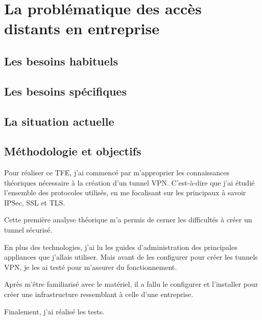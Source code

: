 \part{La problématique des accès distants en entreprise}
\chapter{Les besoins habituels}
\chapter{Les besoins spécifiques}
\chapter{La situation actuelle}
\chapter{Méthodologie et objectifs}
Pour réaliser ce TFE, j'ai commencé par m'approprier les connaissances théoriques nécessaire à la création d'un tunnel VPN.
C'est-à-dire que j'ai étudié l'ensemble des protocoles utilisés, en me focalisant sur les principaux à savoir IPSec, SSL et TLS.

Cette première analyse théorique m'a permis de cerner les difficultés à créer un tunnel sécurisé.

En plus des technologies, j'ai lu les guides d'administration des principales appliances que j'allais utiliser.
Mais avant de les configurer pour créer les tunnels VPN, je les ai testé pour m'assurer du fonctionnement.

Après m'être familiarisé avec le matériel, il a fallu le configurer et l'installer pour créer une infrastructure ressemblant à celle d'une entreprise.

Finalement, j'ai réalisé les tests.
